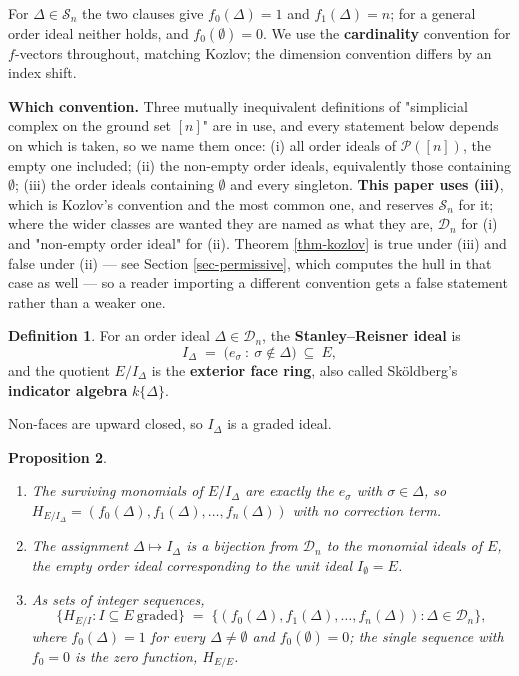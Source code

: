 \documentclass[11pt, a4paper, abstract=yes]{scrartcl}
\theoremstyle{definition}
\newtheorem{definition}{Definition}
\theoremstyle{remark}
\theoremstyle{plain}
\newtheorem{proposition}[definition]{Proposition}
\begin{document}
For \(\Delta\in\mathcal S_n\) the two clauses give \(f_0(\Delta)=1\) and \(f_1(\Delta)=n\); for a
general order ideal neither holds, and \(f_0(\emptyset)=0\). We use the \textbf{cardinality} convention for
\(f\)-vectors throughout, matching Kozlov; the dimension convention differs by an index shift.

\textbf{Which convention.} Three mutually inequivalent definitions of "simplicial complex on the ground set
\([n]\)" are in use, and every statement below depends on which is taken, so we name them once:
(i) all order ideals of \(\mathcal P([n])\), the empty one included; (ii) the non-empty order ideals,
equivalently those containing \(\emptyset\); (iii) the order ideals containing \(\emptyset\) and
every singleton. \textbf{This paper uses (iii)}, which is Kozlov's convention and the most common one, and
reserves \(\mathcal S_n\) for it; where the wider classes are wanted they are named as what they are,
\(\mathcal D_n\) for (i) and "non-empty order ideal" for (ii). Theorem \ref{thm-kozlov} is true under
(iii) and false under (ii) --- see Section \ref{sec-permissive}, which computes the hull in that case as
well --- so a reader importing a different convention gets a false statement rather than a weaker one.

\begin{definition}
For an order ideal \(\Delta\in\mathcal D_n\), the \textbf{Stanley--Reisner ideal} is
\begin{equation}\label{eq:sr-ideal}
  I_\Delta\;=\;\bigl(e_\sigma\ :\ \sigma\notin\Delta\bigr)\ \subseteq\ E,
\end{equation}
and the quotient \(E/I_\Delta\) is the \textbf{exterior face ring}, also called Sköldberg's \textbf{indicator
algebra} \(k\lbrace\Delta\rbrace\).
\label{def-sr-ideal}
\end{definition}

Non-faces are upward closed, so \(I_\Delta\) is a graded ideal.

\begin{proposition}
\begin{enumerate}
\item The surviving monomials of \(E/I_\Delta\) are exactly the \(e_\sigma\) with \(\sigma\in\Delta\),
so \(H_{E/I_\Delta}=(f_0(\Delta),f_1(\Delta),\dots,f_n(\Delta))\) with no correction term.
\item The assignment \(\Delta\mapsto I_\Delta\) is a bijection from \(\mathcal D_n\) to the monomial
ideals of \(E\), the empty order ideal corresponding to the unit ideal \(I_\emptyset=E\).
\item As sets of integer sequences,
\[
     \lbrace H_{E/I}: I\subseteq E\ \text{graded}\rbrace
     \;=\;\lbrace (f_0(\Delta),f_1(\Delta),\dots,f_n(\Delta)): \Delta\in\mathcal D_n\rbrace ,
   \]
where \(f_0(\Delta)=1\) for every \(\Delta\ne\emptyset\) and \(f_0(\emptyset)=0\); the single
sequence with \(f_0=0\) is the zero function, \(H_{E/E}\).
\end{enumerate}
\label{prop-dictionary}
\end{proposition}
\end{document}
